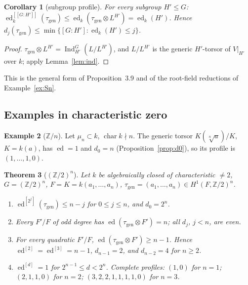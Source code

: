\documentclass[11pt]{amsart}
\newtheorem{theorem}{Theorem}[section]
\newtheorem{corollary}[theorem]{Corollary}
\theoremstyle{definition}
\newtheorem{example}[theorem]{Example}
\theoremstyle{remark}
\newcommand{\ed}{\operatorname{ed}}
\newcommand{\edd}[1]{\ed^{[#1]}}
\newcommand{\Ind}{\operatorname{Ind}}
\newcommand{\gen}{\mathrm{gen}}
\newcommand{\Z}{\mathbb Z}
\newcommand{\stag}[1]{\hfill{\normalfont[#1]}}
\begin{document}
\begin{corollary}[subgroup profile]\label{cor:sub}
For every subgroup $H'\le G$: $\edd{[G:H']}_k(\tau_\gen)\le\ed_k(\tau_\gen\otimes
L^{H'})=\ed_k(H')$. Hence $d_j(\tau_\gen)\le\min\{[G:H']:\ed_k(H')\le j\}$.
\stag{proved}
\end{corollary}

\begin{proof}
$\tau_\gen\otimes L^{H'}=\Ind_{H'}^G(L/L^{H'})$, and $L/L^{H'}$ is the generic
$H'$-torsor of $V|_{H'}$ over $k$; apply Lemma~\ref{lem:ind}.
\end{proof}

This is the general form of Proposition~3.9 and of the root-field reductions of
Example~\ref{ex:Sn}.

\subsection{Examples in characteristic zero}

\begin{example}[$\Z/n$]\label{ex:cyc}
Let $\mu_n\subset k$, $\operatorname{char}k\nmid n$. The generic torsor
$K(\sqrt[n]a)/K$, $K=k(a)$, has $\ed=1$ and $d_0=n$ (Proposition~\ref{prop:d0}), so
its profile is $(1,\dots,1,0)$. \stag{proved}
\end{example}

\begin{theorem}[$(\Z/2)^n$]\label{thm:ea}
Let $k$ be algebraically closed of characteristic $\ne2$, $G=(\Z/2)^n$,
$F=K=k(a_1,\dots,a_n)$, $\tau_\gen=(a_1,\dots,a_n)\in H^1(F,\Z/2)^n$.
\begin{enumerate}
\item[(a)] $\edd{2^j}(\tau_\gen)\le n-j$ for $0\le j\le n$, and $d_0=2^n$.
\item[(b)] Every $F'/F$ of odd degree has $\ed(\tau_\gen\otimes F')=n$; all $d_j$,
$j<n$, are even.
\item[(c)] For every quadratic $F'/F$, $\ed(\tau_\gen\otimes F')\ge n-1$. Hence
$\edd2=\edd3=n-1$, $d_{n-1}=2$, and $d_{n-2}=4$ for $n\ge2$.
\item[(d)] $\edd d=1$ for $2^{n-1}\le d<2^n$. Complete profiles: $(1,0)$ for $n=1$;
$(2,1,1,0)$ for $n=2$; $(3,2,2,1,1,1,1,0)$ for $n=3$.
\end{enumerate}
\stag{proved; inputs cited}
\end{theorem}
\end{document}
